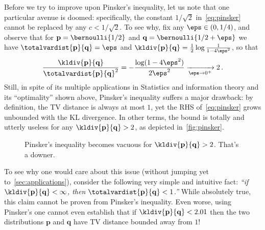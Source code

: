 \documentclass[10pt]{article}
\newcommand{\p}{\mathbf{p}}
\newcommand{\q}{\mathbf{q}}
\begin{document}
Before we try to improve upon Pinsker's inequality, let us note that one particular avenue is doomed: specifically, the constant $1/\sqrt{2}$ in~\eqref{eq:pinsker} cannot be replaced by any $c<1/\sqrt{2}$. To see why, fix any $\eps\in(0,1/4)$, and observe that for $\p=\bernoulli{1/2}$ and $\q=\bernoulli{1/2+\eps}$ we have $\totalvardist{\p}{\q} = \eps$ and $\kldiv{\p}{\q}=\frac{1}{2}\log\frac{1}{1-4\eps^2}$, so that
\begin{equation}
  \frac{\kldiv{\p}{\q}}{\totalvardist{\p}{\q}^2} = -\frac{\log(1-4\eps^2)}{2\eps^2} \xrightarrow[\eps\to 0^+]{}2\,.
\end{equation}
Still, in spite of its multiple applications in Statistics and information theory and its ``optimality'' shown above, Pinsker's inequality suffers a major drawback: by definition, the TV distance is always at most $1$, yet the RHS of~\eqref{eq:pinsker} grows unbounded with the KL divergence. In other terms, the bound is totally and utterly useless for any $\kldiv{\p}{\q}>2$, as depicted in~\autoref{fig:pinsker}.
\begin{figure}[H]\centering
{} 
\caption{\label{fig:pinsker}Pinsker's inequality becomes vacuous for $\kldiv{\p}{\q}>2$. That's a downer.}
\end{figure}
To see why one would care about this issue (without jumping yet to~\autoref{sec:applications}), consider the following very simple and intuitive fact: \emph{``if $\kldiv{\p}{\q}<\infty$, then $\totalvardist{\p}{\q} < 1$.''}  While absolutely true, this claim cannot be proven from Pinsker's inequality. Even worse, using Pinsker's one cannot even establish that if $\kldiv{\p}{\q}< 2.01$ then the two distributions $\p$ and $\q$ have TV distance bounded away from $1$!


\end{document}

